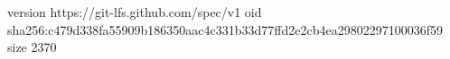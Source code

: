 version https://git-lfs.github.com/spec/v1
oid sha256:c479d338fa55909b186350aac4c331b33d77ffd2e2cb4ea29802297100036f59
size 2370
